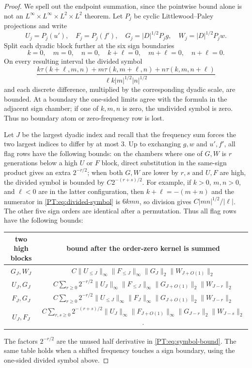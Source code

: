\documentclass[11pt]{amsart}
\numberwithin{equation}{section}
\theoremstyle{definition}
\theoremstyle{remark}
\begin{document}
\begin{proof}
We spell out the endpoint summation, since the pointwise bound alone is
not an $L^\infty\times L^\infty\times L^2\times L^2$ theorem.  Let
$P_j$ be cyclic Littlewood--Paley projections and write
\[
 U_j=P_j(u'),\quad F_j=P_j(f'),\quad
 G_j=|D|^{1/2}P_jg,\quad W_j=|D|^{1/2}P_jw.
\]
Split each dyadic block further at the six sign boundaries
\[
 k=0,\quad m=0,\quad n=0,\quad
 k+\ell=0,\quad m+\ell=0,\quad n+\ell=0.
\]
On every resulting interval the divided symbol
\begin{equation}\label{PT:eq:divided-symbol}
 \frac{k\tau(k+\ell,m,n)+m\tau(k,m+\ell,n)
       +n\tau(k,m,n+\ell)}
      {\ell k|m|^{1/2}|n|^{1/2}}
\end{equation}
and each discrete difference, multiplied by the corresponding dyadic
scale, are bounded.  At a boundary the one-sided limits agree with the
formula in the adjacent sign chamber; if one of $k,m,n$ is zero, the
undivided symbol is zero.  Thus no boundary atom or zero-frequency row is
lost.

Let $J$ be the largest dyadic index and recall that the frequency sum
forces the two largest indices to differ by at most $3$.  Up to exchanging
$g,w$ and $u',f'$, all flag rows have the following bounds:
on the chambers where one of $G,W$ is $r$ generations below a high
$U$ or $F$ block, direct substitution in the same-sign product gives an
extra $2^{-r/2}$; when both $G,W$ are lower by $r,s$ and $U,F$ are high,
the divided symbol is bounded by $C2^{-(r+s)/2}$.  For example, if
$k>0$, $m,n>0$, and $\ell<0$ are in the latter configuration, then
$k+\ell=-(m+n)$ and the numerator in
\eqref{PT:eq:divided-symbol} is $6kmn$, so division gives
$C|mn|^{1/2}/|\ell|$.  The other five sign orders are identical after a
permutation.  Thus all flag rows have the following bounds:
\begin{center}
\begin{tabular}{c|c}
two high blocks & bound after the order-zero kernel is summed\\
\hline
$G_J,W_J$ &
$C\|U_{\le J}\|_\infty\|F_{\le J}\|_\infty
  \|G_J\|_2\|W_{J+O(1)}\|_2$\\
$U_J,G_J$ &
$C\sum_{r\ge0}2^{-r/2}\|U_J\|_\infty
  \|F_{\le J}\|_\infty\|G_{J+O(1)}\|_2\|W_{J-r}\|_2$\\
$F_J,G_J$ &
$C\sum_{r\ge0}2^{-r/2}\|U_{\le J}\|_\infty
  \|F_J\|_\infty\|G_{J+O(1)}\|_2\|W_{J-r}\|_2$\\
$U_J,F_J$ &
$C\sum_{r,s\ge0}2^{-(r+s)/2}\|U_J\|_\infty
  \|F_{J+O(1)}\|_\infty\|G_{J-r}\|_2\|W_{J-s}\|_2$.
\end{tabular}
\end{center}
The factors $2^{-r/2}$ are the unused half derivative in
\eqref{PT:eq:symbol-bound}.  The same table holds when a shifted frequency
touches a sign boundary, using the one-sided divided symbol above.


\end{proof}
\end{document}

